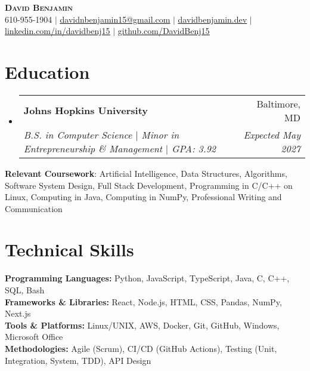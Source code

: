 \documentclass[letterpaper,10pt]{article}
\makeatletter
\newcommand{\resumeItem}[1]{
  \item\small{
    {#1 \vspace{-2pt}}
  }
}
\newcommand{\resumeSubheading}[4]{
  \vspace{-2pt}\item
    \begin{tabular*}{0.97\textwidth}[t]{l@{\extracolsep{\fill}}r}
      \textbf{#1} & #2 \\
      \textit{\small#3} & \textit{\small #4} \\
    \end{tabular*}\vspace{-7pt}
}
\newcommand{\resumeSubHeadingListStart}{\begin{itemize}[leftmargin=0.15in, label={}]}
\newcommand{\resumeSubHeadingListEnd}{\end{itemize}}
\newcommand{\resumeItemListStart}{\begin{itemize}}
\newcommand{\resumeItemListEnd}{\end{itemize}\vspace{-5pt}}
\makeatother
\begin{document}
\begin{center}
    \textbf{\Huge \scshape David Benjamin} \\ \vspace{1pt}
    \small 610-955-1904 $|$ \href{mailto:davidnbenjamin15@gmail.com}{\underline{davidnbenjamin15@gmail.com}} $|$ 
    \href{davidbenjamin.dev}{\underline{davidbenjamin.dev}} $|$
    \href{https://www.linkedin.com/in/davidbenj15/}{\underline{linkedin.com/in/davidbenj15}} $|$
    \href{https://github.com/DavidBenj15}{\underline{github.com/DavidBenj15}}
\end{center}

\section{Education}
  \resumeSubHeadingListStart
    \resumeSubheading
      {Johns Hopkins University}{Baltimore, MD}
      {B.S. in Computer Science $|$ Minor in Entrepreneurship \& Management $|$ GPA: 3.92}{Expected May 2027}
  \resumeSubHeadingListEnd


    \begin{itemize}[leftmargin=0.15in, label={}]
    \small{
        \item{
            \textbf{Relevant Coursework}: Artificial Intelligence, Data Structures, Algorithms, Software System Design, Full Stack Development, Programming in C/C++ on Linux, Computing in Java, Computing in NumPy, Professional Writing and Communication
        }
    }
\end{itemize}

\section{Technical Skills}
\begin{itemize}[leftmargin=0.15in, label={}]
    \small{
        \item{
            \textbf{Programming Languages:} Python, JavaScript, TypeScript, Java, C, C++, SQL, Bash \\
            \textbf{Frameworks \& Libraries:} React, Node.js, HTML, CSS, Pandas, NumPy, Next.js \\
            \textbf{Tools \& Platforms:} Linux/UNIX, AWS, Docker, Git, GitHub, Windows, Microsoft Office \\
            \textbf{Methodologies:} Agile (Scrum), CI/CD (GitHub Actions), Testing (Unit, Integration, System, TDD), API Design
        }
    }
\end{itemize}
\end{document}
